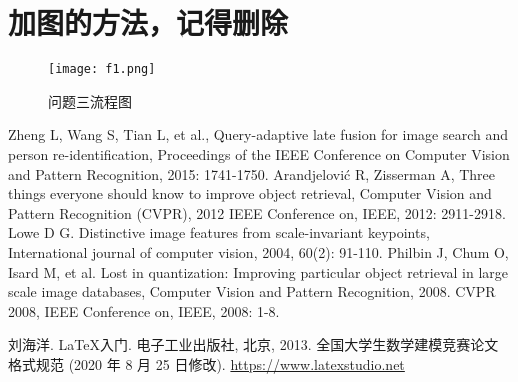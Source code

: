 \documentclass[bwprint]{gmcmthesis}
\begin{document}
\section{加图的方法，记得删除}
\begin{figure}[!h]
\centering
\texttt{[image: f1.png]}
\caption{问题三流程图}
\end{figure}




\newpage



\begin{thebibliography}{99}  
Zheng L, Wang S, Tian L, et al., Query-adaptive late fusion for image search and person re-identification, Proceedings of the IEEE Conference on Computer Vision and Pattern Recognition, 2015: 1741-1750.  
Arandjelović R, Zisserman A, Three things everyone should know to improve object retrieval, Computer Vision and Pattern Recognition (CVPR), 2012 IEEE Conference on, IEEE, 2012: 2911-2918.  
Lowe D G. Distinctive image features from scale-invariant keypoints, International journal of computer vision, 2004, 60(2): 91-110.  
Philbin J, Chum O, Isard M, et al. Lost in quantization: Improving particular object retrieval in large scale image databases, Computer Vision and Pattern Recognition, 2008. CVPR 2008, IEEE Conference on, IEEE, 2008: 1-8.  
\end{thebibliography}



% 
% 


\begin{thebibliography}{9}%
    刘海洋.
    \newblock \LaTeX {}入门\allowbreak[J].
    \newblock 电子工业出版社, 北京, 2013.
    全国大学生数学建模竞赛论文格式规范 (2020 年 8 月 25 日修改).
     \url{https://www.latexstudio.net}
\end{thebibliography}
\end{document}
